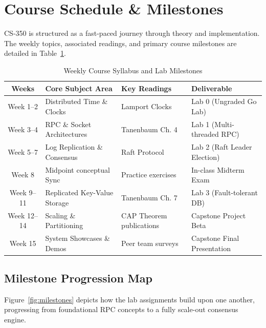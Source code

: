 \section{Course Schedule \& Milestones}

CS-350 is structured as a fast-paced journey through theory and implementation. The weekly topics, associated readings, and primary course milestones are detailed in Table~\ref{tab:schedule}.

\begin{table}[H]
\centering
\caption{Weekly Course Syllabus and Lab Milestones}
\label{tab:schedule}
\begin{tabularx}{\textwidth}{c l X p{4.2cm}}
\toprule
\textbf{Weeks} & \textbf{Core Subject Area} & \textbf{Key Readings} & \textbf{Deliverable} \\
\midrule
Week 1--2 & Distributed Time \& Clocks & Lamport Clocks \citep{lamport1978time} & Lab 0 (Ungraded Go Lab) \\
Week 3--4 & RPC \& Socket Architectures & Tanenbaum Ch. 4 \citep{tanenbaum2017distributed} & Lab 1 (Multi-threaded RPC) \\
Week 5--7 & Log Replication \& Consensus & Raft Protocol \citep{ongaro2014search} & Lab 2 (Raft Leader Election) \\
Week 8 & Midpoint conceptual Sync & Practice exercises & In-class Midterm Exam \\
Week 9--11 & Replicated Key-Value Storage & Tanenbaum Ch. 7 & Lab 3 (Fault-tolerant DB) \\
Week 12--14 & Scaling \& Partitioning & CAP Theorem publications & Capstone Project Beta \\
Week 15 & System Showcases \& Demos & Peer team surveys & Capstone Final Presentation \\
\bottomrule
\end{tabularx}
\end{table}

\subsection{Milestone Progression Map}

Figure~\ref{fig:milestones} depicts how the lab assignments build upon one another, progressing from foundational RPC concepts to a fully scale-out consensus engine.

